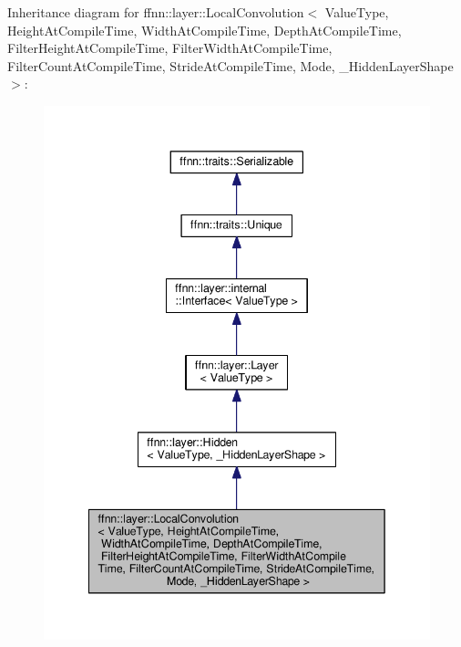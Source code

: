 Inheritance diagram for ffnn\-:\-:layer\-:\-:Local\-Convolution$<$ Value\-Type, Height\-At\-Compile\-Time, Width\-At\-Compile\-Time, Depth\-At\-Compile\-Time, Filter\-Height\-At\-Compile\-Time, Filter\-Width\-At\-Compile\-Time, Filter\-Count\-At\-Compile\-Time, Stride\-At\-Compile\-Time, Mode, \-\_\-\-Hidden\-Layer\-Shape $>$\-:
\nopagebreak
\begin{figure}[H]
\begin{center}
\leavevmode
\includegraphics[width=342pt]{classffnn_1_1layer_1_1_local_convolution__inherit__graph}
\end{center}
\end{figure}


